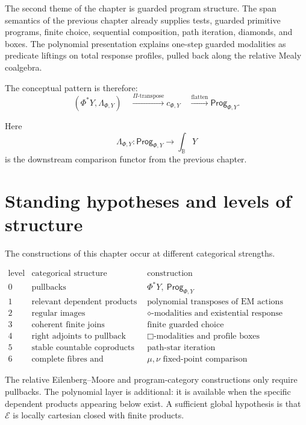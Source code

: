 The second theme of the chapter is guarded program structure.  The span
semantics of the previous chapter already supplies tests, guarded primitive
programs, finite choice, sequential composition, path iteration, diamonds, and
boxes.  The polynomial presentation explains one-step guarded modalities as
predicate liftings on total response profiles, pulled back along the relative
Mealy coalgebra.

The conceptual pattern is therefore:
\[
\boxed{
(\Phi^\ast Y,\Lambda_{\Phi,Y})
\quad
\overset{\Pi\text{-transpose}}{\longrightarrow}
c_{\Phi,Y}
\quad
\overset{\text{flatten}}{\longrightarrow}
\mathsf{Prog}_{\Phi,Y}.
}
\]

Here
\[
\Lambda_{\Phi,Y}:
\mathsf{Prog}_{\Phi,Y}\to\int_{\mathbb B}Y
\]
is the downstream comparison functor from the previous chapter.

\section{Standing hypotheses and levels of structure}
\label{sec:poly-relative-hypotheses}

The constructions of this chapter occur at different categorical strengths.

\begin{center}
\[
\begin{array}{c|c|c}
\text{level} & \text{categorical structure} & \text{construction} \\
\hline
0 & \text{pullbacks} &
\Phi^\ast Y,\ \mathsf{Prog}_{\Phi,Y} \\
1 & \text{relevant dependent products} &
\text{polynomial transposes of EM actions} \\
2 & \text{regular images} &
\diamond\text{-modalities and existential response liftings} \\
3 & \text{coherent finite joins} &
\text{finite guarded choice} \\
4 & \text{right adjoints to pullback} &
\Box\text{-modalities and profile boxes} \\
5 & \text{stable countable coproducts} &
\text{path-star iteration} \\
6 & \text{complete fibres and continuity} &
\mu,\nu\text{ fixed-point comparison}
\end{array}
\]
\end{center}

The relative Eilenberg--Moore and program-category constructions only require
pullbacks.  The polynomial layer is additional: it is available when the
specific dependent products appearing below exist.  A sufficient global
hypothesis is that \(\mathcal E\) is locally cartesian closed with finite
products.

